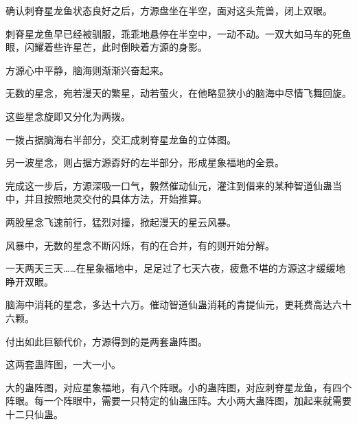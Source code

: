 \begin{this_body}
确认刺脊星龙鱼状态良好之后，方源盘坐在半空，面对这头荒兽，闭上双眼。

刺脊星龙鱼早已经被驯服，乖乖地悬停在半空中，一动不动。一双大如马车的死鱼眼，闪耀着些许星芒，此时倒映着方源的身影。

方源心中平静，脑海则渐渐兴奋起来。

无数的星念，宛若漫天的繁星，动若萤火，在他略显狭小的脑海中尽情飞舞回旋。

这些星念旋即又分化为两拨。

一拨占据脑海右半部分，交汇成刺脊星龙鱼的立体图。

另一波星念，则占据方源孬好的左半部分，形成星象福地的全景。

完成这一步后，方源深吸一口气，毅然催动仙元，灌注到借来的某种智道仙蛊当中，并且按照地灵交付的具体方法，开始推算。

两股星念飞速前行，猛烈对撞，掀起漫天的星云风暴。

风暴中，无数的星念不断闪烁，有的在合并，有的则开始分解。

一天两天三天……在星象福地中，足足过了七天六夜，疲惫不堪的方源这才缓缓地睁开双眼。

脑海中消耗的星念，多达十六万。催动智道仙蛊消耗的青提仙元，更耗费高达六十六颗。

付出如此巨额代价，方源得到的是两套蛊阵图。

这两套蛊阵图，一大一小。

大的蛊阵图，对应星象福地，有八个阵眼。小的蛊阵图，对应刺脊星龙鱼，有四个阵眼。每一个阵眼中，需要一只特定的仙蛊压阵。大小两大蛊阵图，加起来就需要十二只仙蛊。

\end{this_body}

